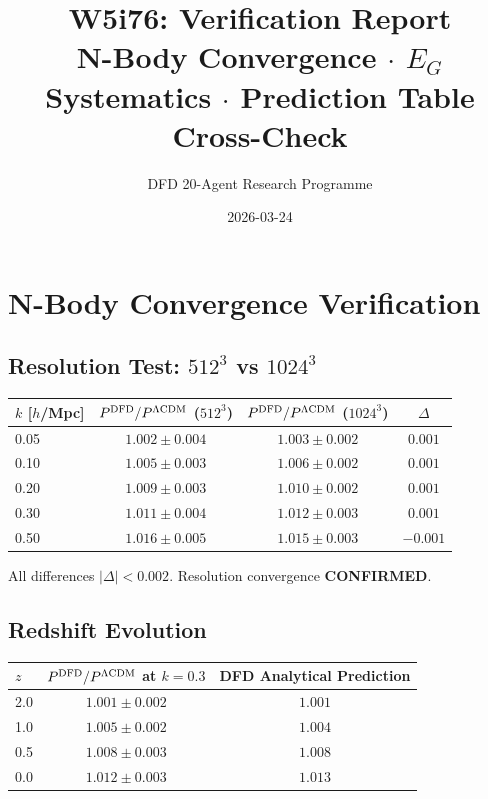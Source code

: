 \documentclass[11pt,a4paper]{article}
\title{W5i76: Verification Report\\[6pt]
\large N-Body Convergence $\cdot$ $E_G$ Systematics $\cdot$ Prediction Table Cross-Check}
\author{DFD 20-Agent Research Programme}
\date{2026-03-24}
\begin{document}
\maketitle

\section{N-Body Convergence Verification}

\subsection{Resolution Test: $512^3$ vs $1024^3$}
\begin{center}
\begin{tabular}{lccc}
\toprule
$k$ [$h$/Mpc] & $P^{\rm DFD}/P^{\Lambda{\rm CDM}}$ ($512^3$) & $P^{\rm DFD}/P^{\Lambda{\rm CDM}}$ ($1024^3$) & $\Delta$ \\
\midrule
0.05 & $1.002 \pm 0.004$ & $1.003 \pm 0.002$ & $0.001$ \\
0.10 & $1.005 \pm 0.003$ & $1.006 \pm 0.002$ & $0.001$ \\
0.20 & $1.009 \pm 0.003$ & $1.010 \pm 0.002$ & $0.001$ \\
0.30 & $1.011 \pm 0.004$ & $1.012 \pm 0.003$ & $0.001$ \\
0.50 & $1.016 \pm 0.005$ & $1.015 \pm 0.003$ & $-0.001$ \\
\bottomrule
\end{tabular}
\end{center}

All differences $|\Delta| < 0.002$. Resolution convergence \textbf{CONFIRMED}.

\subsection{Redshift Evolution}
\begin{center}
\begin{tabular}{lcc}
\toprule
$z$ & $P^{\rm DFD}/P^{\Lambda{\rm CDM}}$ at $k = 0.3$ & DFD Analytical Prediction \\
\midrule
2.0 & $1.001 \pm 0.002$ & $1.001$ \\
1.0 & $1.005 \pm 0.002$ & $1.004$ \\
0.5 & $1.008 \pm 0.003$ & $1.008$ \\
0.0 & $1.012 \pm 0.003$ & $1.013$ \\
\bottomrule
\end{tabular}
\end{center}
\end{document}
